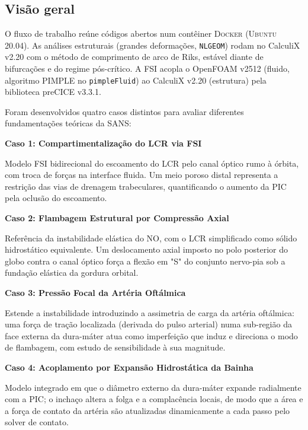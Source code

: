 \documentclass[article, hidelinks,oneside,12pt]{abntex2}
\begin{document}
\subsection*{Visão geral}

O fluxo de trabalho reúne códigos abertos num contêiner \textsc{Docker} (\textsc{Ubuntu} 20.04). As análises estruturais (grandes deformações, \texttt{NLGEOM}) rodam no CalculiX v2.20 com o método de comprimento de arco de Riks, estável diante de bifurcações e do regime pós-crítico. A FSI acopla o OpenFOAM v2512 (fluido, algoritmo PIMPLE no \texttt{pimpleFluid}) ao CalculiX v2.20 (estrutura) pela biblioteca preCICE v3.3.1.

Foram desenvolvidos quatro casos distintos para avaliar diferentes fundamentações teóricas da SANS:

\textbf{Caso 1: Compartimentalização do LCR via FSI}

Modelo FSI bidirecional do escoamento do LCR pelo canal óptico rumo à órbita, com troca de forças na interface fluida. Um meio poroso distal representa a restrição das vias de drenagem trabeculares, quantificando o aumento da PIC pela oclusão do escoamento.

\textbf{Caso 2: Flambagem Estrutural por Compressão Axial}

Referência da instabilidade elástica do NO, com o LCR simplificado como sólido hidrostático equivalente. Um deslocamento axial imposto no polo posterior do globo contra o canal óptico força a flexão em "S" do conjunto nervo-pia sob a fundação elástica da gordura orbital.

\textbf{Caso 3: Pressão Focal da Artéria Oftálmica}

Estende a instabilidade introduzindo a assimetria de carga da artéria oftálmica: uma força de tração localizada (derivada do pulso arterial) numa sub-região da face externa da dura-máter atua como imperfeição que induz e direciona o modo de flambagem, com estudo de sensibilidade à sua magnitude.

\textbf{Caso 4: Acoplamento por Expansão Hidrostática da Bainha}

Modelo integrado em que o diâmetro externo da dura-máter expande radialmente com a PIC; o inchaço altera a folga e a complacência locais, de modo que a área e a força de contato da artéria são atualizadas dinamicamente a cada passo pelo solver de contato.

\end{document}
